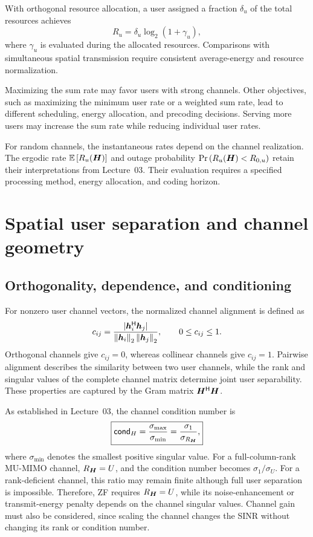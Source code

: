 With orthogonal resource allocation, a user assigned a fraction $\delta_u$ of the total resources achieves
\begin{equation*}
	R_u=\delta_u\log_2(1+\gamma_u),
\end{equation*}
where $\gamma_u$ is evaluated during the allocated resources. Comparisons with simultaneous spatial transmission require consistent average-energy and resource normalization.

Maximizing the sum rate may favor users with strong channels. Other objectives, such as maximizing the minimum user rate or a weighted sum rate, lead to different scheduling, energy allocation, and precoding decisions. Serving more users may increase the sum rate while reducing individual user rates.

For random channels, the instantaneous rates depend on the channel realization. The ergodic rate $\mathbb{E}\left[R_u(\bm{H})\right]$ and outage probability $\Pr\left(R_u(\bm{H})<R_{0,u}\right)$ retain their interpretations from Lecture~03. Their evaluation requires a specified processing method, energy allocation, and coding horizon.



\section{Spatial user separation and channel geometry}
\label{sec:user-separation}

\subsection{Orthogonality, dependence, and conditioning}
For nonzero user channel vectors, the normalized channel alignment is defined as
\begin{equation}
	c_{ij}=\frac{|{\bm{h}}^{\mathsf{H}}_i\bm{h}_j|}
	{\left\|\bm{h}_i\right\|_2\left\|\bm{h}_j\right\|_2},
	\qquad 0\leq c_{ij}\leq1.
	\label{eq:alignment}
\end{equation}
Orthogonal channels give $c_{ij}=0$, whereas collinear channels give $c_{ij}=1$. Pairwise alignment describes the similarity between two user channels, while the rank and singular values of the complete channel matrix determine joint user separability. These properties are captured by the Gram matrix ${\bm{H}}^{\mathsf{H}}\bm{H}$.

As established in Lecture~03, the channel condition number is
\begin{equation}
	\boxed{
		\mathsf{cond}_H
		=\frac{\sigma_{\max}}{\sigma_{\min}}
		=\frac{\sigma_1}{\sigma_{R_{\bm{H}}}},
	}
\end{equation}
where $\sigma_{\min}$ denotes the smallest positive singular value. For a full-column-rank MU-MIMO channel, $R_{\bm{H}}=U$, and the condition number becomes $\sigma_1/\sigma_U$. For a rank-deficient channel, this ratio may remain finite although full user separation is impossible. Therefore, ZF requires $R_{\bm{H}}=U$, while its noise-enhancement or transmit-energy penalty depends on the channel singular values. Channel gain must also be considered, since scaling the channel changes the SINR without changing its rank or condition number.

